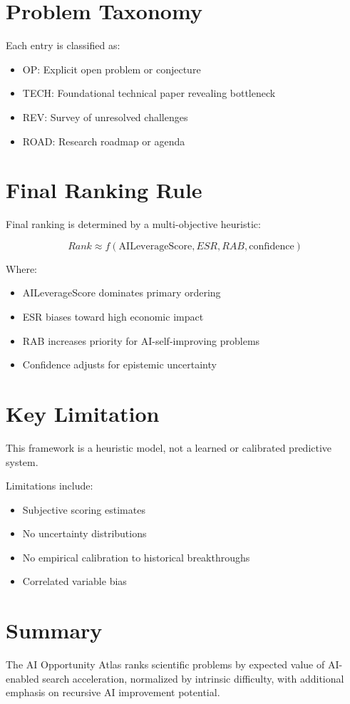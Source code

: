 \documentclass[11pt]{article}
\begin{document}
\section{Problem Taxonomy}

Each entry is classified as:

\begin{itemize}
    \item OP: Explicit open problem or conjecture
    \item TECH: Foundational technical paper revealing bottleneck
    \item REV: Survey of unresolved challenges
    \item ROAD: Research roadmap or agenda
\end{itemize}

\section{Final Ranking Rule}

Final ranking is determined by a multi-objective heuristic:

\begin{equation}
Rank \approx f(\text{AILeverageScore}, ESR, RAB, \text{confidence})
\end{equation}

Where:
\begin{itemize}
    \item AILeverageScore dominates primary ordering
    \item ESR biases toward high economic impact
    \item RAB increases priority for AI-self-improving problems
    \item Confidence adjusts for epistemic uncertainty
\end{itemize}

\section{Key Limitation}

This framework is a heuristic model, not a learned or calibrated predictive system.

Limitations include:
\begin{itemize}
    \item Subjective scoring estimates
    \item No uncertainty distributions
    \item No empirical calibration to historical breakthroughs
    \item Correlated variable bias
\end{itemize}

\section{Summary}

The AI Opportunity Atlas ranks scientific problems by expected value of AI-enabled search acceleration, normalized by intrinsic difficulty, with additional emphasis on recursive AI improvement potential.
\end{document}

